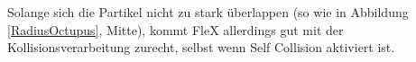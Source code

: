 Solange sich die Partikel nicht zu stark überlappen (so wie in Abbildung \ref{RadiusOctupus}, Mitte), kommt FleX allerdings gut mit der Kollisionsverarbeitung zurecht, selbst wenn Self Collision aktiviert ist.




%
%
%
%
%
%


